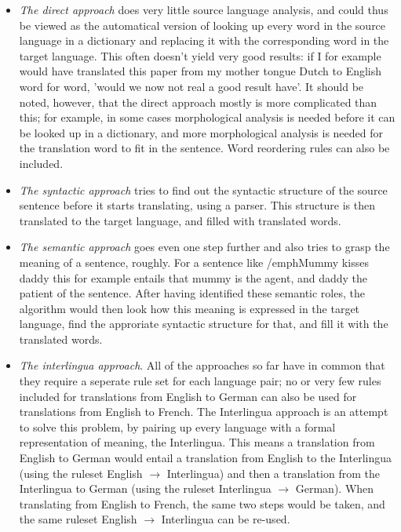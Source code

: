 \documentclass[12pt]{article}
\begin{document}
\begin{itemize}
\item \emph{The direct approach} does very little source language analysis, and could thus be viewed as the automatical version of looking up every word in the source language in a dictionary and replacing it with the corresponding word in the target language. This often doesn't yield very good results: if I for example would have translated this paper from my mother tongue Dutch to English word for word, 'would we now not real a good result have'. It should be noted, however, that the direct approach mostly is more complicated than this; for example, in some cases morphological analysis is needed before it can be looked up in a dictionary, and more morphological analysis is needed for the translation word to fit in the sentence. Word reordering rules can also be included.
\item \emph{The syntactic approach} tries to find out the syntactic structure of the source sentence before it starts translating, using a parser. This structure is then translated to the target language, and filled with translated words.
\item \emph{The semantic approach} goes even one step further and also tries to grasp the meaning of a sentence, roughly. For a sentence like /emph{Mummy kisses daddy} this for example entails that mummy is the agent, and daddy the patient of the sentence. After having identified these semantic roles, the algorithm would then look how this meaning is expressed in the target language, find the approriate syntactic structure for that, and fill it with the translated words.
\item \emph{The interlingua approach}. All of the approaches so far have in common that they require a seperate rule set for each language pair; no or very few rules included for translations from English to German can also be used for translations from English to French. The Interlingua approach is an attempt to solve this problem, by pairing up every language with a formal representation of meaning, the Interlingua. This means a translation from English to German would entail a translation from English to the Interlingua (using the ruleset English $\rightarrow$ Interlingua) and then a translation from the Interlingua to German (using the ruleset Interlingua $\rightarrow$ German). When translating from English to French, the same two steps would be taken, and the same ruleset English $\rightarrow$ Interlingua can be re-used. 
\end{itemize}
\end{document}
